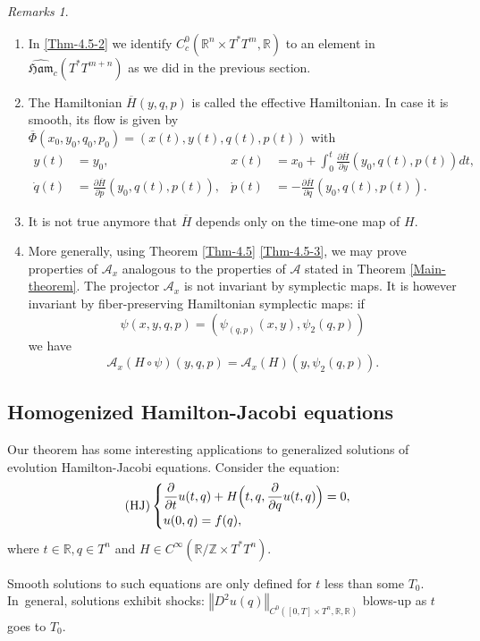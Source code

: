 \documentclass[JEP,XML,SOM,NoFloatCountersInSection,Unicode,published]{cedram}
\newcommand{\HJ}{\mathrm{HJ}}
\numberwithin{equation}{section}
\newcommand {\Ham}{{\mathfrak {Ham}}}
\newcommand{\gclHamc}[1]{\widehat{\Ham}_c(#1)}
\theoremstyle{plain}
\theoremstyle{definition}
\theoremstyle{remark}
\newtheorem{remarks}[theorem]{Remarks}
\begin{document}
\skpt
\begin{remarks}
\begin{enumerate}
\item In \ref{Thm-4.5-2} we identify $C_c^{0}(\mathbb{R}^{n}\times T^*T^m,\mathbb{R})$ to an element in $\gclHamc {T^*T^{m+n}}$ as we did in the previous section.
\item The Hamiltonian $\overline {H}(y,q,p)$ is called the effective Hamiltonian. In case it is smooth, its flow is given by ${\overline \Phi}(x_{0},y_{0},q_{0},p_{0})=(x(t),y(t),q(t),p(t))$ with
\begin{align*}
y(t)&=y_{0},& x(t)&=x_0+\int_{0}^{t} \frac{\partial \overline H}{\partial y}(y_{0},q(t),p(t)) dt, \\
\dot q (t)&= \frac{\partial \overline H}{\partial p}(y_{0},q(t),p(t)),&\dot p (t)&= -\frac{\partial \overline H}{\partial q}(y_{0},q(t),p(t)).
\end{align*}
\item It is not true anymore that $\overline H$ depends only on the time-one map of $H$.
\item More generally, using Theorem \ref{Thm-4.5} \ref{Thm-4.5-3}, we may prove properties of $\mathcal A_{x}$ analogous to the properties of $\mathcal A$ stated in Theorem \ref{Main-theorem}. The projector ${\mathcal A}_{x}$ is not invariant by symplectic maps. It is however invariant by fiber-preserving Hamiltonian symplectic maps: if
\[
\psi(x,y,q,p)=(\psi_{(q,p)}(x,y), \psi_{2}(q,p))
\]
we have
\[
{\mathcal A}_{x}(H\circ \psi)(y,q,p)={\mathcal A}_{x}(H)(y,\psi_{2}(q,p)).
\]
\end{enumerate} \end{remarks}
\subsection{Homogenized Hamilton-Jacobi equations}
Our theorem has some interesting applications to generalized
solutions of evolution Hamilton-Jacobi equations. Consider the equation:
\begin{equation} \label{Eq-HJ}
\tag{$\HJ$}
\begin{cases}
\dfrac{\partial}{\partial t} u (t,q) + H \Bigl(t,q, \dfrac{\partial}{\partial q}u (t,q)\Bigr) = 0,\\
u (0,q) = f(q),
\end{cases}
\end{equation}
where $t\in \mathbb{R}, q \in T^{n}$ and $H\in C^\infty({\mathbb R}/ \mathbb Z \times T^*T^n) $.

Smooth solutions to such equations are only defined for $t$ less than
some $T_{0}$. In~general, solutions exhibit shocks: $\left \Vert D^2u(q)
\right \Vert_{C^{0}([0,T]\times T^{n},\mathbb{R}, {\mathbb R})}$ blows-up as $t$ goes to
$T_{0}$.
\end{document}
